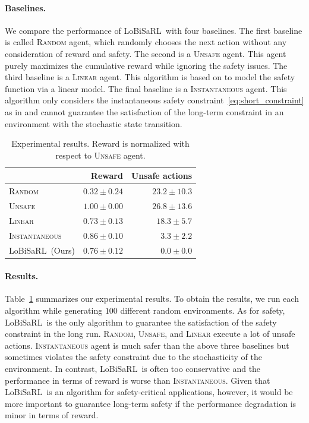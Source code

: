 \documentclass[letterpaper]{article} %
\newcommand{\algo}{\textsf{LoBiSaRL}}
\begin{document}
\paragraph{Baselines.}
We compare the performance of \algo~with four baselines.
The first baseline is called \textsc{Random} agent, which randomly chooses the next action without any consideration of reward and safety.
The second is a \textsc{Unsafe} agent.
This agent purely maximizes the cumulative reward while ignoring the safety issues.
The third baseline is a \textsc{Linear} agent.
This algorithm is based on \citet{amani2021safe} to model the safety function via a linear model.
The final baseline is a \textsc{Instantaneous} agent.
This algorithm only considers the instantaneous safety constraint~\eqref{eq:short_constraint} as in \citet{wachi2021safe} and cannot guarantee the satisfaction of the long-term constraint in an environment with the stochastic state transition.


\begin{table}[t]
\centering
\begin{small}
\begin{tabular}{lrr}
\toprule
& Reward & Unsafe actions \\
\midrule
\textsc{Random} & $0.32 \pm 0.24$ & $23.2 \pm 10.3$ \\
\textsc{Unsafe} & $\bm{1.00 \pm 0.00}$ & $26.8 \pm 13.6$ \\
\textsc{Linear} & $0.73 \pm 0.13$ & $18.3 \pm 5.7$  \\
\textsc{Instantaneous} & $0.86 \pm 0.10$ & $3.3 \pm 2.2$ \\
\algo~(Ours) & $0.76 \pm 0.12$ & $\bm{0.0 \pm 0.0}$ \\
\bottomrule
\end{tabular}
\end{small}
\caption{Experimental results. Reward is normalized with respect to \textsc{Unsafe} agent.}
\label{tab:result}
\end{table}

\paragraph{Results.}

Table~\ref{tab:result} summarizes our experimental results.
To obtain the results, we run each algorithm while generating $100$ different random environments.
As for safety, \algo~is the only algorithm to guarantee the satisfaction of the safety constraint in the long run.
\textsc{Random}, \textsc{Unsafe}, and \textsc{Linear} execute a lot of unsafe actions.
\textsc{Instantaneous} agent is much safer than the above three baselines but sometimes violates the safety constraint due to the stochasticity of the environment.
In contrast, \algo~is often too conservative and the performance in terms of reward is worse than \textsc{Instantaneous}.
Given that \algo~is an algorithm for safety-critical applications, however, it would be more important to guarantee long-term safety if the performance degradation is minor in terms of reward.
\end{document}
